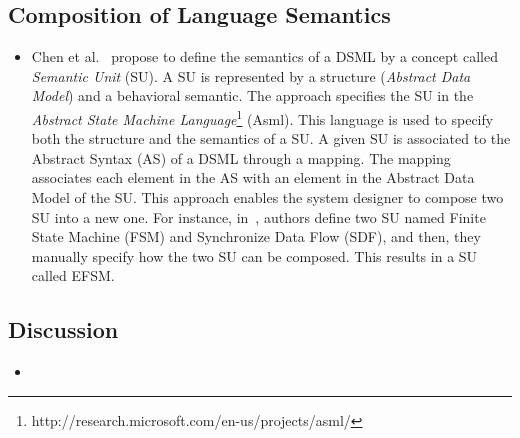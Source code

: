 	\subsection{Composition of Language Semantics}
	\begin{itemize} 
		
		\item Chen et al.~\cite{semanticsanchoring} propose to define the semantics of a DSML by a concept called \emph{Semantic Unit} (SU). A SU is represented by a structure (\emph{Abstract Data Model}) and a behavioral semantic. The approach specifies the SU in the \emph{Abstract State Machine Language}\footnote{http://research.microsoft.com/en-us/projects/asml/} (Asml). This language is used to specify both the structure and the semantics of a SU. A given SU is associated to the Abstract Syntax (AS) of a DSML through a mapping. The mapping associates each element in the AS with an element in the Abstract Data Model of the SU. This approach  enables the system designer to compose two SU into a new one. For instance, in~\cite{composemanticanch}, authors define two SU named Finite State Machine (FSM) and Synchronize Data Flow (SDF), and then, they manually specify how the two SU can be composed. This results in a SU called EFSM.  
		
	\end{itemize}
	
	\subsection{Discussion}
		\begin{itemize}
			\item  {} 
		\end{itemize}